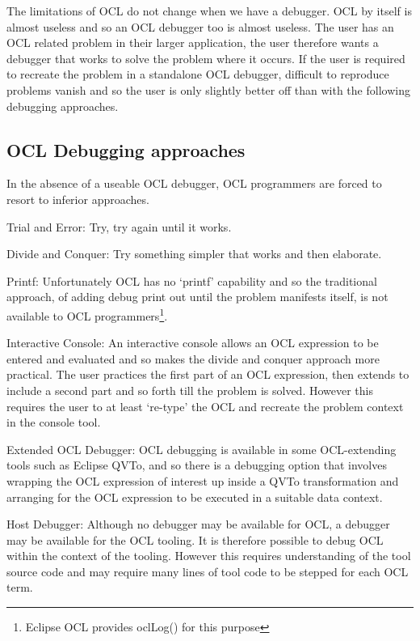 \documentclass[a4paper]{article}
\begin{document}

The limitations of OCL do not change when we have a debugger. OCL by itself is almost useless and so an OCL debugger too is almost useless. The user has an OCL related problem in their larger application, the user therefore wants a debugger that works to solve the problem where it occurs. If the user is required to recreate the problem in a standalone OCL debugger, difficult to reproduce problems vanish and so the user is only slightly better off than with the following debugging approaches.

\subsection{OCL Debugging approaches}

In the absence of a useable OCL debugger, OCL programmers are forced to resort to inferior approaches.

Trial and Error: Try, try again until it works.

Divide and Conquer: Try something simpler that works and then elaborate.

Printf: Unfortunately OCL has no `printf' capability and so the traditional approach, of adding debug print out until the problem manifests itself, is not available to OCL programmers\footnote{Eclipse OCL provides oclLog() for this purpose}.

Interactive Console: An interactive console allows an OCL expression to be entered and evaluated and so makes the divide and conquer approach more practical. The user practices the first part of an OCL expression, then extends to include a second part and so forth till the problem is solved. However this requires the user to at least `re-type' the OCL and recreate the problem context in the console tool.

Extended OCL Debugger: OCL debugging is available in some OCL-extending tools such as Eclipse QVTo, and so there is a debugging option that involves wrapping the OCL expression of interest up inside a QVTo transformation and arranging for the OCL expression to be executed in a suitable data context.

Host Debugger: Although no debugger may be available for OCL, a debugger may be available for the OCL tooling. It is therefore possible to debug OCL within the context of the tooling. However this requires understanding of the tool source code and may require many lines of tool code to be stepped for each OCL term.
\end{document}
